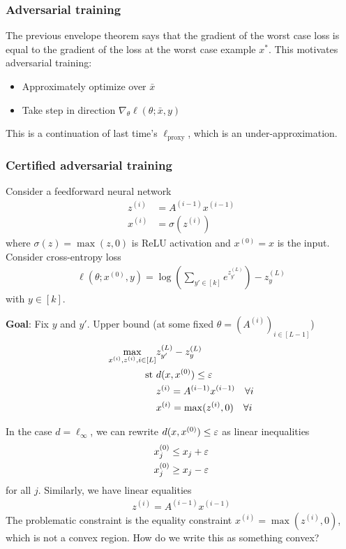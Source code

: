 \subsubsection{Adversarial training}

The previous envelope theorem says that the gradient of the worst case loss
is equal to the gradient of the loss at the worst case example $x^*$.
This motivates adversarial training:
\begin{itemize}
  \item Approximately optimize over $\bar{x}$
  \item Take step in direction $\nabla_\theta \ell(\theta; \bar{x}, y)$
\end{itemize}

This is a continuation of last time's $\ell_{\text{proxy}}$, which
is an under-approximation.

\subsubsection{Certified adversarial training}

Consider a feedforward neural network
\begin{align}
  z^{(i)} &= A^{(i-1)} x^{(i-1)} \\
  x^{(i)} &= \sigma(z^{(i)})
\end{align}
where $\sigma(z) = \max(z,0)$ is ReLU activation and $x^{(0)} = x$ is the
input. Consider cross-entropy loss
\begin{align}
  \ell(\theta; x^{(0)}, y) = \log \left(\sum_{y' \in [k]} e^{z^{(L)}_{y'}}\right) - z^{(L)}_{y}
\end{align}
with $y \in [k]$.

\textbf{Goal}: Fix $y$ and $y'$. Upper bound (at some fixed $\theta = (A^{(i)})_{i \in [L-1]}$)
\begin{align}
  \max_{x^{(i)}, z^{(i)}, i \in [L]} 
  &z^{(L)}_{y'} - z^{(L)}_y \\
  \text{st }
  &d(x,x^{(0)}) \leq \varepsilon \\
  &z^{(i)} = A^{(i-1)}x^{(i-1)} \quad\forall i \\
  &x^{(i)} = \max(z^{(i)}, 0) \quad\forall i
\end{align}

In the case $d = \ell_{\infty}$, we can rewrite $d(x,x^{(0)}) \leq \varepsilon$
as linear inequalities
\begin{align}
  x^{(0)}_j &\leq x_j + \varepsilon  \\
  x^{(0)}_j &\geq x_j - \varepsilon
\end{align}
for all $j$. Similarly, we have linear equalities
\begin{align}
  z^{(i)} = A^{(i-1)} x^{(i-1)}
\end{align}
The problematic constraint is the equality constraint $x^{(i)} = \max(z^{(i)}, 0)$,
which is not a convex region. How do we write this as something convex?

